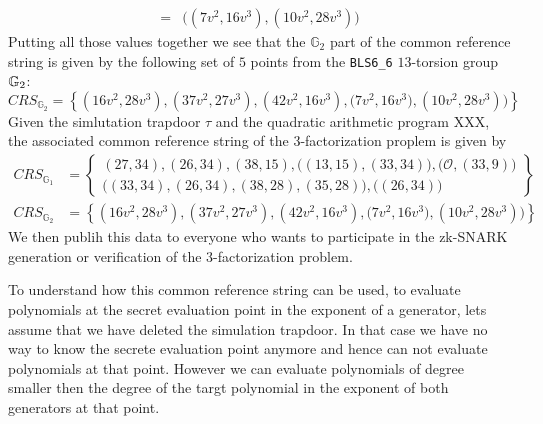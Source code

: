 \begin{example}
\begin{align*}
 = & \Big((7v^2,16v^3),(10v^2,28v^3)\Big)
\end{align*}
Putting all those values together we see that the $\mathbb{G}_2$ part of the common reference string is given by the following set of $5$ points from the \texttt{BLS6\_6} $13$-torsion group $\mathbb{G}_2$:
$$
CRS_{\mathbb{G}_{2}}=\left\{(16v^2,28v^3) ,(37v^2,27v^3),(42v^2,16v^3),\Big(7v^2,16v^3), (10v^2,28v^3)\Big)\right\} 
$$
Given the simlutation trapdoor $\tau$ and the quadratic arithmetic program XXX, the associated common reference string of the $3$-factorization proplem is given by
\begin{align*}
CRS_{\mathbb{G}_{1}} &=\left\{ \begin{array}{c}
(27,34),(26,34),(38,15),\Big((13,15),(33,34)\Big),
\Big(\mathcal{O}, (33,9)\Big)\\
\Big((33,34),(26,34),(38,28),(35,28)\Big),
\Big((26,34)\Big)
\end{array}\right\}\\
CRS_{\mathbb{G}_{2}} &=\left\{(16v^2,28v^3) ,(37v^2,27v^3),(42v^2,16v^3),\Big(7v^2,16v^3), (10v^2,28v^3)\Big)\right\}
\end{align*}
We then publih this data to everyone who wants to participate in the zk-SNARK generation or verification of the $3$-factorization problem.

To understand how this common reference string can be used, to evaluate polynomials at the secret evaluation point in the exponent of a generator, lets assume that we have deleted the simulation trapdoor. In that case we have no way to know the secrete evaluation point anymore and hence can not evaluate polynomials at that point. However we can evaluate polynomials of degree smaller then the degree of the targt polynomial in the exponent of both generators at that point. 


\end{example}
